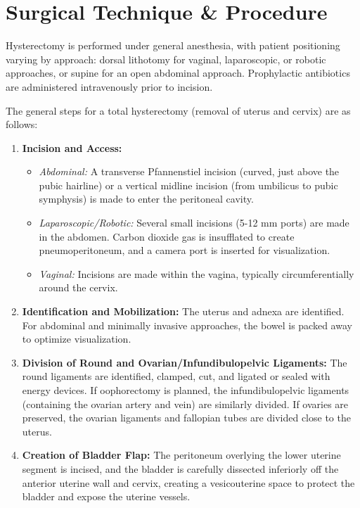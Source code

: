 \section*{Surgical Technique \& Procedure}
Hysterectomy is performed under general anesthesia, with patient positioning varying by approach: dorsal lithotomy for vaginal, laparoscopic, or robotic approaches, or supine for an open abdominal approach. Prophylactic antibiotics are administered intravenously prior to incision.

The general steps for a total hysterectomy (removal of uterus and cervix) are as follows:

\begin{enumerate}
  \item \textbf{Incision and Access:}
    \begin{itemize}
      \item \textit{Abdominal:} A transverse Pfannenstiel incision (curved, just above the pubic hairline) or a vertical midline incision (from umbilicus to pubic symphysis) is made to enter the peritoneal cavity.
      \item \textit{Laparoscopic/Robotic:} Several small incisions (5-12 mm ports) are made in the abdomen. Carbon dioxide gas is insufflated to create pneumoperitoneum, and a camera port is inserted for visualization.
      \item \textit{Vaginal:} Incisions are made within the vagina, typically circumferentially around the cervix.
    \end{itemize}
  
  \item \textbf{Identification and Mobilization:} The uterus and adnexa are identified. For abdominal and minimally invasive approaches, the bowel is packed away to optimize visualization.

  \item \textbf{Division of Round and Ovarian/Infundibulopelvic Ligaments:} The round ligaments are identified, clamped, cut, and ligated or sealed with energy devices. If oophorectomy is planned, the infundibulopelvic ligaments (containing the ovarian artery and vein) are similarly divided. If ovaries are preserved, the ovarian ligaments and fallopian tubes are divided close to the uterus.

  \item \textbf{Creation of Bladder Flap:} The peritoneum overlying the lower uterine segment is incised, and the bladder is carefully dissected inferiorly off the anterior uterine wall and cervix, creating a vesicouterine space to protect the bladder and expose the uterine vessels.


\end{enumerate}
